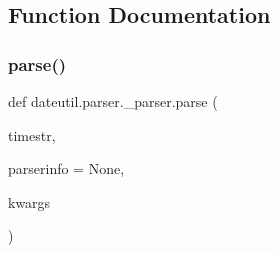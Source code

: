 \subsection{Function Documentation}
\mbox{\label{namespacedateutil_1_1parser_1_1__parser_aa5fbf50041e5bc1cee98263750783f7c}} 
\subsubsection{\texorpdfstring{parse()}{parse()}}
{\footnotesize\ttfamily def dateutil.\+parser.\+\_\+parser.\+parse (\begin{DoxyParamCaption}\item[{}]{timestr,  }\item[{}]{parserinfo = {\ttfamily None},  }\item[{}]{kwargs }\end{DoxyParamCaption})}

